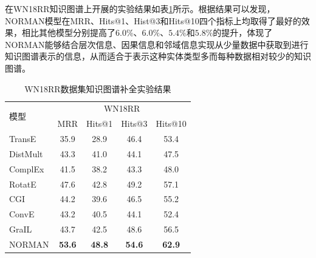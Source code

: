 \documentclass[algorithmlist, AutoFakeBold, AutoFakeSlant, figurelist, tablelist, nomlist, engineering]{seuthesix}
\begin{document}
在WN18RR知识图谱上开展的实验结果如表\ref{Experiment1_WN18RR}所示。根据结果可以发现，NORMAN模型在MRR、Hits@1、Hist@3和Hits@10四个指标上均取得了最好的效果，相比其他模型分别提高了$6.0\%$、$6.0\%$、$5.4\%$和$5.8\%$的提升，体现了NORMAN能够结合层次信息、因果信息和邻域信息实现从少量数据中获取到进行知识图谱表示的信息，从而适合于表示这种实体类型多而每种数据相对较少的知识图谱。
\begin{table}[]
  \centering
  \begin{tabular*}{0.95\textwidth}{@{\extracolsep{\fill}}lcccc}
  \toprule[1pt]
  \multirow{2}{*}{模型} & \multicolumn{4}{c}{WN18RR} \\
    & MRR & Hits@1 & Hits@3 & Hits@10 \\ \hline
  TransE & 35.9 & 28.9 & 46.4 & 53.4 \\
  DistMult & 43.3 & 41.0 & 44.1 & 47.5 \\
  ComplEx & 41.5 & 38.2 & 43.3 & 48.0 \\
  RotatE & 47.6 & 42.8 & 49.2 & 57.1 \\
  CGI & 44.2 & 39.6 & 46.5 & 55.2 \\
  ConvE & 43.2 & 40.5 & 44.1 & 52.4 \\
  GraIL & 43.7 & 42.5 & 48.6 & 56.5 \\
  NORMAN & \textbf{53.6} & \textbf{48.8} & \textbf{54.6} & \textbf{62.9} \\
  \bottomrule[1pt]
  \end{tabular*}
  \caption{WN18RR数据集知识图谱补全实验结果}
  \label{Experiment1_WN18RR}
\end{table}
\end{document}
